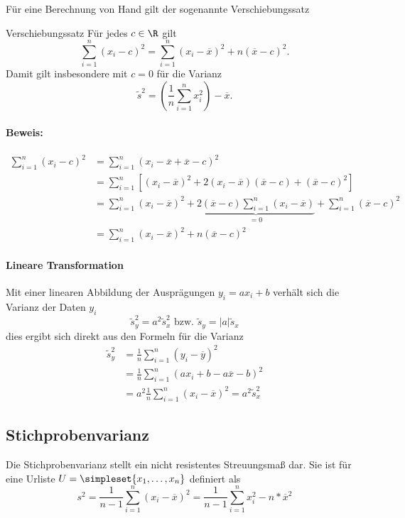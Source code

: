 Für eine Berechnung von Hand gilt der sogenannte Verschiebungssatz
\begin{satz}{Verschiebungssatz}
	Für jedes $c\in\R$ gilt
	\begin{equation*}
	    \sum_{i=1}^n(x_i-c)^2=\sum_{i=1}^n(x_i-\overline x)^2+n(\overline x -c)^2.
	\end{equation*}
	Damit gilt insbesondere mit $c=0$ für die Varianz
	\begin{equation*}
		\tilde s^2=\left(\frac1n \sum_{i=1}^n x_i^2\right)-\overline x.
	\end{equation*}
\end{satz}
\paragraph{Beweis:}
\begin{align*}
    \sum_{i=1}^n(x_i-c)^2&=\sum_{i=1}^n(x_i-\overline x+\overline x-c)^2\\
    &=\sum_{i=1}^n\left[(x_i-\overline x)^2+2(x_i-\overline x)(\overline x-c)+(\overline x-c)^2\right]\\
    &=\sum_{i=1}^n(x_i-\overline x)^2 + \underbrace{2(\overline x-c)\sum_{i=1}^n(x_i-\overline x)}_{=0}+\sum_{i=1}^n(\overline x-c)^2\\
    &=\sum_{i=1}^n(x_i-\overline x)^2+n(\overline x -c)^2
\end{align*}

\paragraph{Lineare Transformation}
Mit einer linearen Abbildung der Ausprägungen $y_i=ax_i+b$ verhält sich die Varianz der Daten $y_i$
\begin{equation*}
	\tilde s_y^2=a^2\tilde s_x^2\text{ bzw. }\tilde s_y=|a|\tilde s_x
\end{equation*}
dies ergibt sich direkt aus den Formeln für die Varianz
\begin{align*}
    \tilde s_y^2&=\frac 1n\sum_{i=1}^n(y_i-\overline y)^2\\
    &=\frac 1n \sum_{i=1}^n(ax_i+b-a\overline x-b)^2\\
    &=a^2\frac 1n\sum_{i=1}^n(x_i-\overline x)^2=a^2\tilde s_x^2
\end{align*}

\subsection{Stichprobenvarianz}
Die Stichprobenvarianz stellt ein nicht resistentes Streuungsmaß dar. Sie ist für eine Urliste $U=\simpleset{x_1,\ldots,x_n}$ definiert als
\begin{equation*}
	s^2=\frac{1}{n-1}\sum_{i=1}^n (x_i-\overline x)^2=\frac{1}{n-1}\sum_{i=1}^n x_i^2 - n*\overline x^2
\end{equation*}



